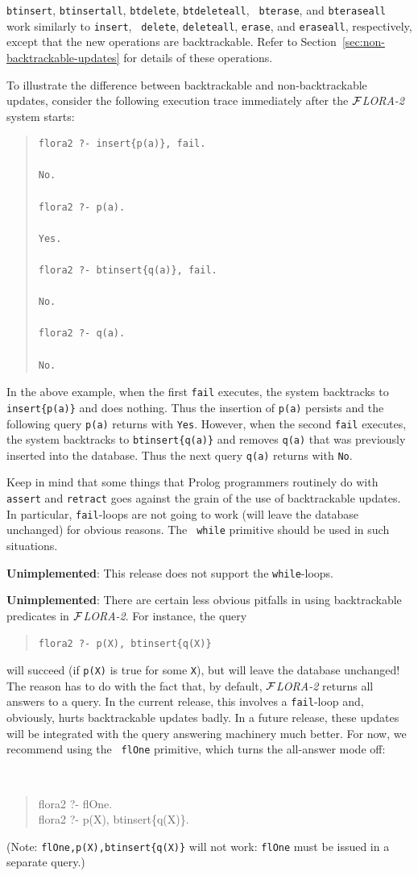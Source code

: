 \documentclass[11pt]{article}
\newcommand{\FLORA}{{\mbox{${\cal F}${\small\it LORA}\rm\emph{-2}}}\xspace}
\begin{document}
{\tt btinsert}, {\tt btinsertall}, {\tt btdelete}, {\tt btdeleteall}, {\tt
  bterase}, and {\tt bteraseall} work similarly to {\tt insert}, {\tt
  delete}, {\tt deleteall}, {\tt erase}, and {\tt eraseall}, respectively,
except that the new operations are backtrackable.  Refer to
Section~\ref{sec:non-backtrackable-updates} for details of these
operations.

To illustrate the difference between backtrackable and
non-backtrackable updates, consider the following execution trace
immediately after the \FLORA system starts:
\begin{quote}
\begin{verbatim}
flora2 ?- insert{p(a)}, fail.

No.

flora2 ?- p(a).

Yes.

flora2 ?- btinsert{q(a)}, fail.

No.

flora2 ?- q(a).

No.
\end{verbatim}
\end{quote}
In the above example, when the first \verb|fail| executes, the system
backtracks to {\tt insert\{p(a)\}} and does nothing. Thus the insertion
of {\tt p(a)} persists and the following query \verb|p(a)| returns
with {\tt Yes}. However, when the second \verb|fail| executes, the
system backtracks to {\tt btinsert\{q(a)\}} and removes {\tt q(a)} that
was previously inserted into the database. Thus the next query
\verb|q(a)| returns with {\tt No}.

Keep in mind that some things that Prolog programmers routinely do with
{\tt assert} and {\tt retract} goes against the grain of the use of
backtrackable updates. In particular, {\tt fail}-loops are not going to
work (will leave the database unchanged) for obvious reasons. The {\tt
  while} primitive should be used in such situations.

{\bf Unimplemented}:  This release does not support the {\tt while}-loops.

{\bf Unimplemented}: There are certain less obvious pitfalls in using backtrackable predicates
in \FLORA. For instance, the query
\begin{quote}
 {\tt flora2 ?- p(X), btinsert\{q(X)\}}  
\end{quote}
will succeed (if {\tt p(X)} is true for some {\tt X}), but will leave the
database unchanged! The reason has to do with the fact that, by default,
\FLORA returns all answers to a query.  In the current release, this
involves a {\tt fail}-loop and, obviously, hurts backtrackable updates
badly. In a future release, these updates will be integrated with the query
answering machinery much better. For now, we recommend using the {\tt
  flOne} primitive, which turns the all-answer mode off:
{\tt
\begin{quote}
  flora2 ?- flOne.\\
  flora2 ?- p(X), btinsert\{q(X)\}.
\end{quote}
}
\noindent
(Note: {\tt flOne,p(X),btinsert\{q(X)\}} will not work: {\tt flOne} must be
issued in a separate query.)
\end{document}
